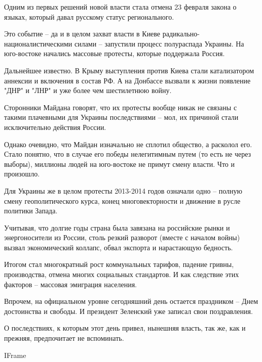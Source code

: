Одним из первых решений новой власти стала отмена 23 февраля закона о
языках, который давал русскому статус регионального. 

Это событие – да и в целом захват власти в Киеве
радикально-националистическими силами –  запустили процесс полураспада
Украины. На юго-востоке начались массовые протесты, которые поддержала
Россия. 

Дальнейшее известно. В Крыму выступления против Киева стали катализатором
аннексии и включения в состав РФ. А на Донбассе вызвали к жизни появление
"ДНР" и "ЛНР" и уже более чем шестилетнюю войну.

Сторонники Майдана говорят, что их протесты вообще никак не связаны с
такими плачевными для Украины последствиями – мол, их причиной стали
исключительно действия России. 

Однако очевидно, что Майдан изначально не сплотил общество, а расколол
его. Стало понятно, что в случае его победы нелегитимным путем (то есть не
через выборы), миллионы людей на юго-востоке не примут смену власти. Что и
произошло. 

Для Украины же в целом протесты 2013-2014 годов означали одно – полную
смену геополитического курса, конец многовекторности и движение в русле
политики Запада.

Учитывая, что долгие годы страна была завязана на российские рынки и
энергоносители из России, столь резкий разворот (вместе с началом войны)
вызвал экономический коллапс, обвал экспорта и нарастающую бедность.  

Итогом стал многократный рост коммунальных тарифов, падение гривны,
производства, отмена многих социальных стандартов. И как следствие этих
факторов – массовая эмиграция населения. 

Впрочем, на официальном уровне сегодняшний день остается праздником – Днем
достоинства и свободы. И президент Зеленский уже записал свои
поздравления. 

О последствиях, к которым этот день привел, нынешняя власть, так же, как и
прежняя, предпочитает не вспоминать.

IFrame


